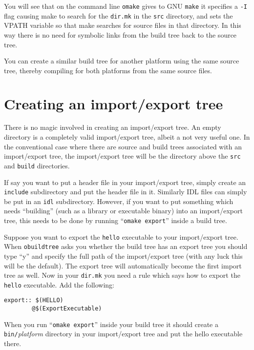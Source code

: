 \documentclass[11pt,twoside,onecolumn]{article}
\begin{document}
You will see that on the command line {\tt omake} gives to GNU {\tt make} it
specifies a {\tt -I} flag causing make to search for the {\tt dir.mk} in the
{\tt src} directory, and sets the VPATH variable so that make searches for
source files in that directory.  In this way there is no need for symbolic
links from the build tree back to the source tree.

You can create a similar build tree for another platform using the same source
tree, thereby compiling for both platforms from the same source files.

\section{Creating an import/export tree}

There is no magic involved in creating an import/export tree.  An empty
directory is a completely valid import/export tree, albeit a not very useful
one.  In the conventional case where there are source and build trees
associated with an import/export tree, the import/export tree will be the
directory above the {\tt src} and {\tt build} directories.

If say you want to put a header file in your import/export tree, simply create
an {\tt include} subdirectory and put the header file in it.  Similarly IDL
files can simply be put in an {\tt idl} subdirectory.  However, if you want to
put something which needs ``building'' (such as a library or executable binary)
into an import/export tree, this needs to be done by running ``{\tt omake
export}'' inside a build tree.

Suppose you want to export the {\tt hello} executable to your import/export
tree.  When {\tt obuildtree} asks you whether the build tree has an export tree
you should type ``y'' and specify the full path of the import/export tree (with
any luck this will be the default).  The export tree will automatically become
the first import tree as well.  Now in your {\tt dir.mk} you need a rule which
says how to export the {\tt hello} executable.  Add the following:

{\footnotesize \begin{verbatim}
export:: $(HELLO)
        @$(ExportExecutable)
\end{verbatim}}

When you run ``{\tt omake export}'' inside your build tree it should create a
{\tt bin/}{\it platform} directory in your import/export tree and put the hello
executable there.
\end{document}
